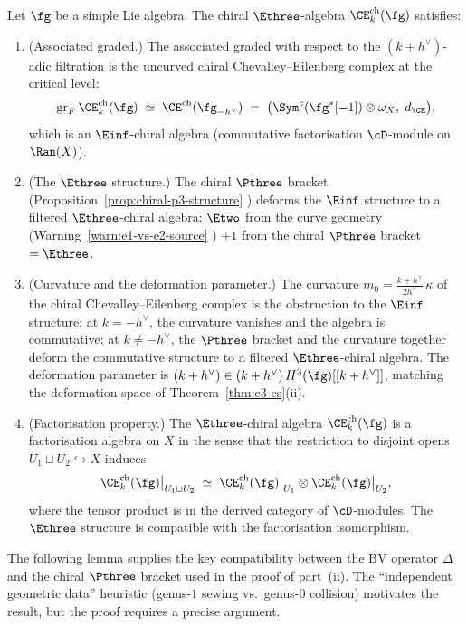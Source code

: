 \begin{theorem}
\label{thm:chiral-e3-structure}
Let $\fg$ be a simple Lie algebra.
The chiral $\Ethree$-algebra
$\CE^{\mathrm{ch}}_k(\fg)$ satisfies:
\begin{enumerate}[label=\textup{(\roman*)}]
\item \textup{(Associated graded.)}
  The associated graded with respect to the $(k+h^\vee)$-adic
  filtration is the uncurved chiral Chevalley--Eilenberg
  complex at the critical level:
  \begin{equation}\label{eq:assoc-graded}
    \mathrm{gr}_F\,\CE^{\mathrm{ch}}_k(\fg)
    \;\simeq\;
    \CE^{\mathrm{ch}}(\fg_{-h^\vee})
    \;=\;
    \bigl(\Sym^c(\fg^*[-1]) \otimes \omega_X,\; d_{\CE}\bigr),
  \end{equation}
  which is an $\Einf$-chiral algebra \textup{(}commutative
  factorisation $\cD$-module on $\Ran(X)$\textup{)}.
\item \textup{(The $\Ethree$ structure.)}
  The chiral $\Pthree$ bracket
  \textup{(}Proposition~\textup{\ref{prop:chiral-p3-structure}}%
  \textup{)} deforms the $\Einf$ structure to
  a filtered $\Ethree$-chiral algebra:
  $\Etwo$ from the curve geometry
  \textup{(}Warning~\textup{\ref{warn:e1-vs-e2-source}}%
  \textup{)} $+ 1$ from the chiral $\Pthree$ bracket
  $= \Ethree$.
\item \textup{(Curvature and the deformation parameter.)}
  The curvature
  $m_0 = \tfrac{k + h^\vee}{2h^\vee}\,\kappa$ of the chiral
  Chevalley--Eilenberg complex is the obstruction to the
  $\Einf$ structure: at $k = -h^\vee$, the curvature vanishes
  and the algebra is commutative; at $k \neq -h^\vee$, the
  $\Pthree$ bracket and the curvature together deform the
  commutative structure to a filtered $\Ethree$-chiral
  algebra.
  The deformation parameter is $(k+h^\vee) \in
  (k+h^\vee)\,H^3(\fg)[[k+h^\vee]]$,
  matching the deformation space of
  Theorem~\textup{\ref{thm:e3-cs}(ii)}.
\item \textup{(Factorisation property.)}
  The $\Ethree$-chiral algebra
  $\CE^{\mathrm{ch}}_k(\fg)$ is a factorisation algebra on
  $X$ in the sense that the restriction to disjoint
  opens $U_1 \sqcup U_2 \hookrightarrow X$ induces
  \begin{equation}\label{eq:factorisation}
    \CE^{\mathrm{ch}}_k(\fg)\big|_{U_1 \sqcup U_2}
    \;\simeq\;
    \CE^{\mathrm{ch}}_k(\fg)\big|_{U_1}
    \otimes
    \CE^{\mathrm{ch}}_k(\fg)\big|_{U_2},
  \end{equation}
  where the tensor product is in the derived category of
  $\cD$-modules. The $\Ethree$ structure is compatible with
  the factorisation isomorphism.
\end{enumerate}
\end{theorem}
The following lemma supplies the key compatibility between
the BV operator $\Delta$ and the chiral $\Pthree$ bracket
used in the proof of part~(ii). The ``independent
geometric data'' heuristic (genus-$1$ sewing vs.\
genus-$0$ collision) motivates the result, but
the proof requires a precise argument.

